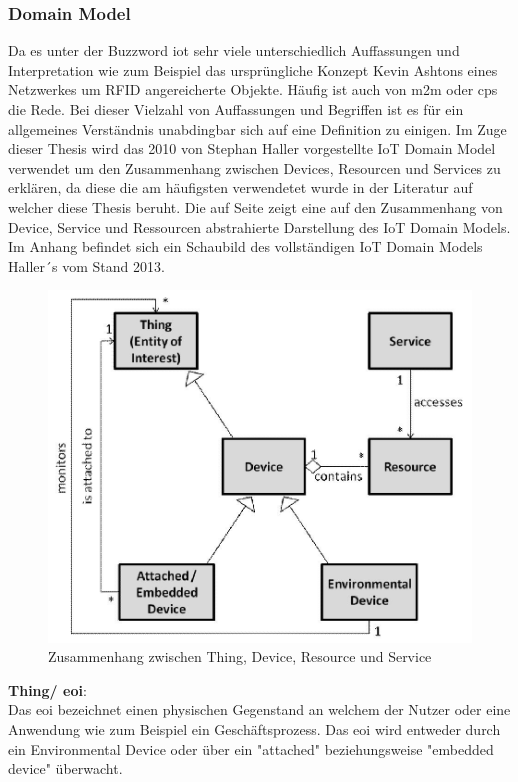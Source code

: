 \documentclass[a4paper, 12pt, twoside, headsepline=true]{scrartcl} %
\begin{document}

\subsubsection{Domain Model}\label{sec:DomainModel}

Da es unter der Buzzword \ac{iot} sehr viele unterschiedlich Auffassungen und Interpretation wie zum Beispiel das ursprüngliche Konzept Kevin Ashtons eines Netzwerkes um RFID angereicherte Objekte. Häufig ist auch von \ac{m2m} oder \ac{cps} die Rede. Bei dieser Vielzahl von Auffassungen und Begriffen ist es für ein allgemeines Verständnis unabdingbar sich auf eine Definition zu einigen. Im Zuge dieser Thesis wird das 2010 von Stephan Haller vorgestellte IoT Domain Model verwendet um den Zusammenhang zwischen Devices, Resourcen und Services zu erklären\cite{haller2010things}, da diese die am häufigsten verwendetet wurde in der Literatur auf welcher diese Thesis beruht. Die auf Seite \pageref{fig:domainmodel} zeigt eine auf den Zusammenhang von Device, Service und Ressourcen abstrahierte Darstellung des IoT Domain Models. Im Anhang befindet sich ein Schaubild des vollständigen IoT Domain Models Haller´s vom Stand 2013.

\begin{figure}[H]
	\includegraphics[height=8 cm,keepaspectratio,center]{figures/domainmodel}
	\caption{Zusammenhang zwischen Thing, Device, Resource und Service \cite{haller2010things}}
	\label{domainmodel}
\end{figure}

\textbf{Thing/ \ac{eoi}}: \\ 
Das \ac{eoi} bezeichnet einen physischen Gegenstand an welchem der Nutzer oder eine Anwendung wie zum Beispiel ein Geschäftsprozess. Das \ac{eoi} wird entweder durch ein Environmental Device oder über ein "attached" beziehungsweise "embedded device" überwacht.
\\
\end{document}
